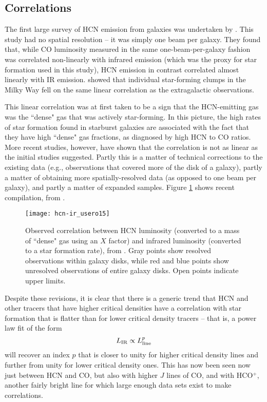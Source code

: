 \subsection{Correlations}

The first large survey of HCN emission from galaxies was undertaken by \citet{gao04b, gao04a}. This study had no spatial resolution -- it was simply one beam per galaxy. They found that, while CO luminosity measured in the same one-beam-per-galaxy fashion was correlated non-linearly with infrared emission (which was the proxy for star formation used in this study), HCN emission in contrast correlated almost linearly with IR emission. \citet{wu05a} showed that individual star-forming clumps in the Milky Way fell on the same linear correlation as the extragalactic observations.

This linear correlation was at first taken to be a sign that the HCN-emitting gas was the ``dense" gas that was actively star-forming. In this picture, the high rates of star formation found in starburst galaxies are associated with the fact that they have high ``dense" gas fractions, as diagnosed by high HCN to CO ratios. More recent studies, however, have shown that the correlation is not as linear as the initial studies suggested. Partly this is a matter of technical corrections to the existing data (e.g., observations that covered more of the disk of a galaxy), partly a matter of obtaining more spatially-resolved data (as opposed to one beam per galaxy), and partly a matter of expanded samples. Figure \ref{fig:hcn-ir} shows recent compilation, from \citet{usero15a}.

\begin{figure}
\texttt{[image: hcn-ir\_usero15]}
\caption[Infrared-HCN luminosity correlation]{
\label{fig:hcn-ir}
Observed correlation between HCN luminosity (converted to a mass of ``dense" gas using an $X$ factor) and infrared luminosity (converted to a star formation rate), from \citet{usero15a}. Gray points show resolved observations within galaxy disks, while red and blue points show unresolved observations of entire galaxy disks. Open points indicate upper limits.
}
\end{figure}

Despite these revisions, it is clear that there is a generic trend that HCN and other tracers that have higher critical densities have a correlation with star formation that is flatter than for lower critical density tracers -- that is, a power law fit of the form
\begin{equation}
L_{\rm IR} \propto L_{\rm line}^p
\end{equation}
will recover an index $p$ that is closer to unity for higher critical density lines and further from unity for lower critical density ones. This has now been seen now just between HCN and CO, but also with higher $J$ lines of CO, and with HCO$^+$, another fairly bright line for which large enough data sets exist to make correlations.

